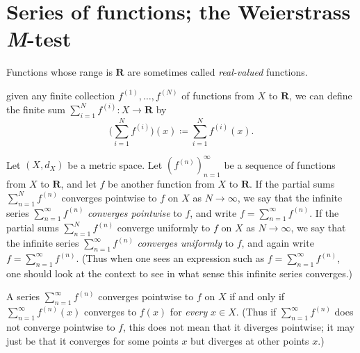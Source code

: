 \section{Series of functions; the Weierstrass \emph{M}-test}\label{sec 3.5}

\begin{note}
    Functions whose range is \(\mathbf{R}\) are sometimes called \emph{real-valued} functions.
\end{note}

\begin{note}
    given any finite collection \(f^{(1)}, \dots, f^{(N)}\) of functions from \(X\) to \(\mathbf{R}\), we can define the finite sum \(\sum_{i = 1}^N f^{(i)} : X \to \mathbf{R}\) by
    \[
        \bigg(\sum_{i = 1}^N f^{(i)}\bigg)(x) \coloneqq \sum_{i = 1}^N f^{(i)}(x).
    \]
\end{note}

\setcounter{theorem}{1}
\begin{definition}\label{3.5.2}
    Let \((X, d_X)\) be a metric space.
    Let \((f^{(n)})_{n = 1}^\infty\) be a sequence of functions from \(X\) to \(\mathbf{R}\), and let \(f\) be another function from \(X\) to \(\mathbf{R}\).
    If the partial sums \(\sum_{n = 1}^N f^{(n)}\) converges pointwise to \(f\) on \(X\) as \(N \to \infty\), we say that the infinite series \(\sum_{n = 1}^\infty f^{(n)}\) \emph{converges pointwise} to \(f\), and write \(f = \sum_{n = 1}^\infty f^{(n)}\).
    If the partial sums \(\sum_{n = 1}^N f^{(n)}\) converge uniformly to \(f\) on \(X\) as \(N \to \infty\), we say that the infinite series \(\sum_{n = 1}^\infty f^{(n)}\) \emph{converges uniformly} to \(f\), and again write \(f = \sum_{n = 1}^\infty f^{(n)}\).
    (Thus when one sees an expression such as \(f = \sum_{n = 1}^\infty f^{(n)}\), one should look at the context to see in what sense this infinite series converges.)
\end{definition}

\begin{remark}\label{3.5.3}
    A series \(\sum_{n = 1}^\infty f^{(n)}\) converges pointwise to \(f\) on \(X\) if and only if \(\sum_{n = 1}^\infty f^{(n)}(x)\) converges to \(f(x)\) for \emph{every} \(x \in X\).
    (Thus if \(\sum_{n = 1}^\infty f^{(n)}\) does not converge pointwise to \(f\), this does not mean that it diverges pointwise;
    it may just be that it converges for some points \(x\) but diverges at other points \(x\).)
\end{remark}

